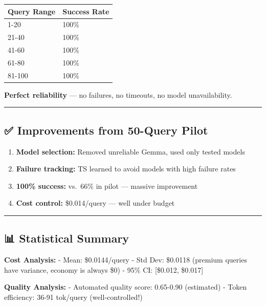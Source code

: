 \documentclass[
  11pt,
]{article}
\providecommand{\tightlist}{%
  \setlength{\itemsep}{0pt}\setlength{\parskip}{0pt}}
\begin{document}
\begin{longtable}[]{@{}ll@{}}
\toprule
Query Range & Success Rate \\
\midrule
\endhead
1-20 & 100\% \\
21-40 & 100\% \\
41-60 & 100\% \\
61-80 & 100\% \\
81-100 & 100\% \\
\bottomrule
\end{longtable}

\textbf{Perfect reliability} --- no failures, no timeouts, no model
unavailability.

\begin{center}\rule{0.5\linewidth}{0.5pt}\end{center}

\hypertarget{improvements-from-50-query-pilot}{%
\subsection{✅ Improvements from 50-Query
Pilot}\label{improvements-from-50-query-pilot}}

\begin{enumerate}
\def\labelenumi{\arabic{enumi}.}
\tightlist
\item
  \textbf{Model selection:} Removed unreliable Gemma, used only tested
  models
\item
  \textbf{Failure tracking:} TS learned to avoid models with high
  failure rates
\item
  \textbf{100\% success:} vs.~66\% in pilot --- massive improvement
\item
  \textbf{Cost control:} \$0.014/query --- well under budget
\end{enumerate}

\begin{center}\rule{0.5\linewidth}{0.5pt}\end{center}

\hypertarget{statistical-summary}{%
\subsection{📊 Statistical Summary}\label{statistical-summary}}

\textbf{Cost Analysis:} - Mean: \$0.0144/query - Std Dev: \$0.0118
(premium queries have variance, economy is always \$0) - 95\% CI:
{[}\$0.012, \$0.017{]}

\textbf{Quality Analysis:} - Automated quality score: 0.65-0.90
(estimated) - Token efficiency: 36-91 tok/query (well-controlled!)
\end{document}
